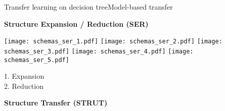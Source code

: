 \begin{frame}{Transfer learning on decision tree}{Model-based transfer}
\begin{minipage}[t]{0.49\linewidth}
    \vspace{0pt}
    \centering
    \textbf{Structure Expansion / Reduction (SER)}
    
    \renewcommand{\ratio}{0.55}
    \begin{overprint}
        \centering\texttt{[image: schemas\_ser\_1.pdf]}
        \centering\texttt{[image: schemas\_ser\_2.pdf]}
        \centering\texttt{[image: schemas\_ser\_3.pdf]}
        \centering\texttt{[image: schemas\_ser\_4.pdf]}
        \centering\texttt{[image: schemas\_ser\_5.pdf]}
    \end{overprint}
    
    \pause \pause
    \textcolor{myblue}{1. Expansion}\\
    \pause
    \textcolor{myorange}{2. Reduction}\\
    \bigskip

\end{minipage}\hfill
\begin{minipage}[t]{0.49\linewidth}
    \vspace{0pt}
    \centering
    \textbf{Structure Transfer (STRUT)}
    

\end{minipage}
\end{frame}
